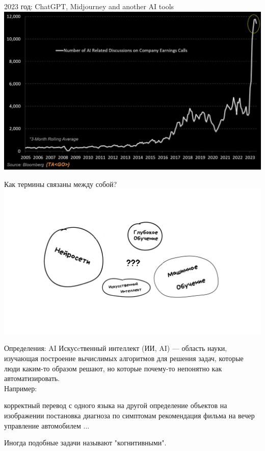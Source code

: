 \documentclass[aspectratio=169, professionalfonts]{beamer}
\begin{document}
\begin{frame}{2023 год: ChatGPT, Midjourney and another AI tools}
    \centering
    \includegraphics[width=.7\linewidth]{figures/fig2-ai-discussions.jpg}
\end{frame}

\begin{frame}{Как термины связаны между собой?}
    \centering
    \includegraphics[width=.85\linewidth]{figures/fig3-terms.jpg}
\end{frame}

\begin{frame}{Определения: AI}
    Искусcтвенный интеллект (ИИ, AI) --- область науки, изучающая построение вычислимых
    алгоритмов для решения задач, которые люди каким-то образом решают,
    но которые почему-то непонятно как автоматизировать.\\
    Например:
    \begin{outline}
        \1 корректный перевод с одного языка на другой
        \1 определение объектов на изображении
        \1 постановка диагноза по симптомам
        \1 рекомендация фильма на вечер
        \1 управление автомобилем
        \1 ...
    \end{outline}

    Иногда подобные задачи называют "когнитивными".
\end{frame}
\end{document}
